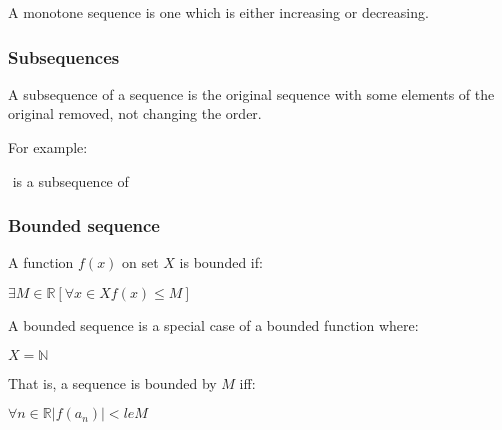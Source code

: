 A monotone sequence is one which is either increasing or decreasing.

\subsubsection{Subsequences}

A subsequence of a sequence is the original sequence with some elements of the original removed, not changing the order.

For example:

\(<1,3,5>\) is a subsequence of \(<2,1,3,4,7,5>\)

\subsubsection{Bounded sequence}

A function \(f(x)\) on set \(X\) is bounded if:

$\exists M\in \mathbb{R} [\forall x\in X f(x)\le M]$

A bounded sequence is a special case of a bounded function where:

$X=\mathbb{N}$

That is, a sequence is bounded by \(M\) iff:

$\forall n\in \mathbb{R} |f(a_n)|<le M$

